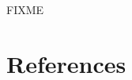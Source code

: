 \documentclass[]{interact}
\theoremstyle{plain}%
\theoremstyle{definition}
\theoremstyle{remark}
\begin{document}
FIXME




\section{References}





\end{document}
